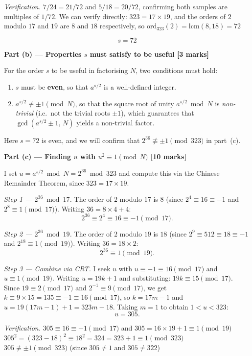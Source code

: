 \documentclass[12pt,a4paper]{article}
\begin{document}
\textit{Verification.} $7/24=21/72$ and $5/18=20/72$, confirming both samples are multiples of $1/72$.
We can verify directly: $323=17\times19$, and the orders of $2$ modulo $17$ and $19$ are $8$ and $18$
respectively, so $\mathrm{ord}_{323}(2)=\mathrm{lcm}(8,18)=72$~\checkmark

\[
  \boxed{s = 72}
\]

\medskip
\textbf{Part (b) --- Properties $s$ must satisfy to be useful [3 marks]}

\medskip
For the order $s$ to be useful in factorising $N$, two conditions must hold:
\begin{enumerate}
  \item $s$ must be \textbf{even}, so that $a^{s/2}$ is a well-defined integer.
  \item $a^{s/2}\not\equiv\pm1\pmod{N}$, so that the square root of unity $a^{s/2}\bmod N$
        is \emph{non-trivial} (i.e.\ not the trivial roots $\pm1$), which guarantees that
        $\gcd(a^{s/2}\pm1,\,N)$ yields a non-trivial factor.
\end{enumerate}
Here $s=72$ is even, and we will confirm that $2^{36}\not\equiv\pm1\pmod{323}$ in part~(c).

\medskip
\textbf{Part (c) --- Finding $u$ with $u^2\equiv1\pmod{N}$ [10 marks]}

\medskip
I set $u=a^{s/2}\bmod N = 2^{36}\bmod 323$ and compute this via the Chinese Remainder Theorem,
since $323=17\times19$.

\textit{Step 1 --- $2^{36}\bmod 17$.}
The order of $2$ modulo $17$ is $8$ (since $2^4\equiv16\equiv-1$ and $2^8\equiv1\pmod{17}$).
Writing $36=8\times4+4$:
\[
  2^{36} \equiv 2^4 \equiv 16 \equiv -1 \pmod{17}.
\]

\textit{Step 2 --- $2^{36}\bmod 19$.}
The order of $2$ modulo $19$ is $18$ (since $2^9\equiv512\equiv18\equiv-1$ and $2^{18}\equiv1\pmod{19}$).
Writing $36=18\times2$:
\[
  2^{36} \equiv 1 \pmod{19}.
\]

\textit{Step 3 --- Combine via CRT.}
I seek $u$ with $u\equiv-1\equiv16\pmod{17}$ and $u\equiv1\pmod{19}$.
Writing $u=19k+1$ and substituting: $19k\equiv15\pmod{17}$.
Since $19\equiv2\pmod{17}$ and $2^{-1}\equiv9\pmod{17}$, we get $k\equiv9\times15=135\equiv-1\equiv16\pmod{17}$,
so $k=17m-1$ and $u=19(17m-1)+1=323m-18$.
Taking $m=1$ to obtain $1<u<323$:
\[
  u = 305.
\]

\textit{Verification.}
$305\equiv16\equiv-1\pmod{17}$ and $305=16\times19+1\equiv1\pmod{19}$~\checkmark\;
$305^2=(323-18)^2\equiv18^2=324=323+1\equiv1\pmod{323}$~\checkmark\;
$305\not\equiv\pm1\pmod{323}$ (since $305\neq1$ and $305\neq322$)~\checkmark
\end{document}
